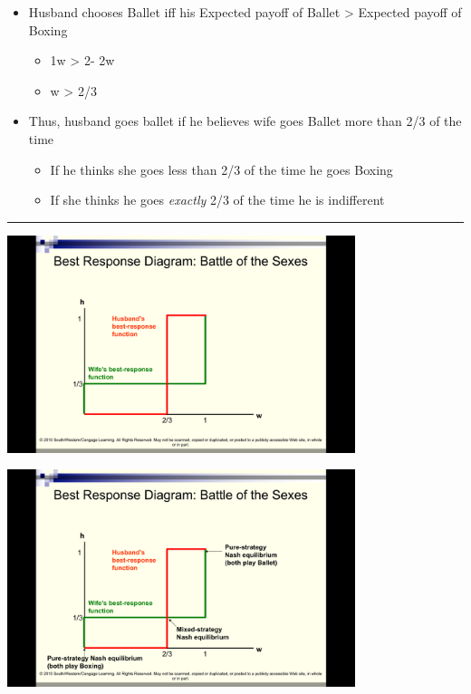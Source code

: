 \documentclass[]{article}
\providecommand{\tightlist}{%
  \setlength{\itemsep}{0pt}\setlength{\parskip}{0pt}}
\begin{document}
\begin{itemize}
\tightlist
\item
  Husband chooses Ballet iff his Expected payoff of Ballet
  \textgreater{} Expected payoff of Boxing

  \begin{itemize}
  \tightlist
  \item
    1w \textgreater{} 2- 2w
  \item
    w \textgreater{} 2/3
  \end{itemize}
\item
  Thus, husband goes ballet if he believes wife goes Ballet more than
  2/3 of the time

  \begin{itemize}
  \tightlist
  \item
    If he thinks she goes less than 2/3 of the time he goes Boxing
  \item
    If she thinks he goes \emph{exactly} 2/3 of the time he is
    indifferent
  \end{itemize}
\end{itemize}

\begin{center}\rule{0.5\linewidth}{\linethickness}\end{center}

\includegraphics[height=2.5in]{picsfigs/bosbr2.png}

\includegraphics[height=2.5in]{picsfigs/bosbr3.png}
\end{document}
